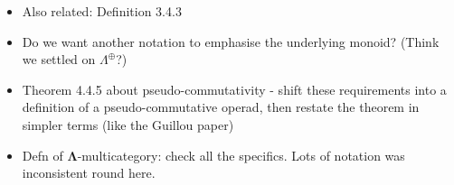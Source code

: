 \documentclass{amsart}
\begin{document}
\begin{itemize}
\item Also related: Definition 3.4.3
\item Do we want another notation to emphasise the underlying monoid? (Think we settled on $\Lambda^{\oplus}$?)
\item Theorem 4.4.5 about pseudo-commutativity - shift these requirements into a definition of a pseudo-commutative operad, then restate the theorem in simpler terms (like the Guillou paper)
\item Defn of $\mathbf{\Lambda}$-multicategory: check all the specifics. Lots of notation was inconsistent round here.
\end{itemize}
\end{document}
